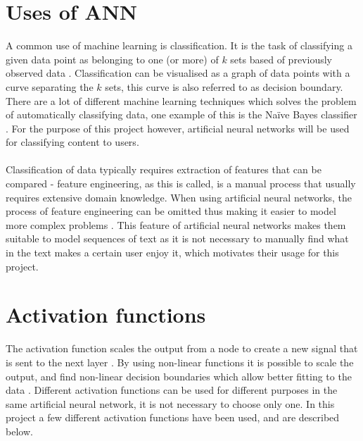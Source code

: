 \section{Uses of ANN}
A common use of machine learning is classification. It is the task of classifying a given data point as belonging to one (or more) of $k$ sets based of previously observed data \parencite{Michie94machinelearning}. Classification can be visualised as a graph of data points with a curve separating the $k$ sets, this curve is also referred to as decision boundary. There are a lot of different machine learning techniques which solves the problem of automatically classifying data, one example of this is the Naïve Bayes classifier \parencite{rish2001empirical}. For the purpose of this project however, artificial neural networks will be used for classifying content to users.
\\\\
Classification of data typically requires extraction of features that can be compared - feature engineering, as this is called, is a manual process that usually requires extensive domain knowledge. When using artificial neural networks, the process of feature engineering can be omitted  thus making it easier to model more complex problems \parencite{nlp2011ronan}. This feature of artificial neural networks makes them suitable to model sequences of text as it is not necessary to manually find what in the text makes a certain user enjoy it, which motivates their usage for this project.


\section{Activation functions}\label{activationfunction}
The activation function scales the output from a node to create a new signal that is sent to the next layer \parencite{basheer2000artificial}. By using non-linear functions it is possible to scale the output, and find non-linear decision boundaries which allow better fitting to the data \parencite{lippmann1987introduction, basheer2000artificial}. Different activation functions can be used for different purposes in the same artificial neural network, it is not necessary to choose only one. In this project a few different activation functions have been used, and are described below.

